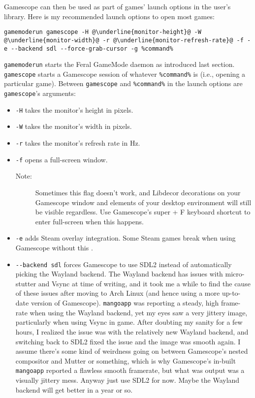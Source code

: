 \documentclass[a4paper]{article}
\begin{document}
Gamescope can then be used as part of games' launch options in the user's library.
Here is my recommended launch options to open most games:
\begin{lstlisting}[escapechar=@]
gamemoderun gamescope -H @\underline{monitor-height}@ -W @\underline{monitor-width}@ -r @\underline{monitor-refresh-rate}@ -f -e --backend sdl --force-grab-cursor -g %command%
\end{lstlisting}
\lstinline|gamemoderun| starts the Feral GameMode daemon as introduced last section.
\lstinline|gamescope| starts a Gamescope session of whatever \lstinline|%command%| is (i.e., opening a particular game).
Between \lstinline|gamescope| and \lstinline|%command%| in the launch options are \lstinline|gamescope|'s arguments:
\begin{itemize}
    \item \lstinline|-H| takes the monitor's height in pixels.
    \item \lstinline|-W| takes the monitor's width in pixels.
    \item \lstinline|-r| takes the monitor's refresh rate in Hz.
    \item \lstinline|-f| opens a full-screen window.
    \begin{description}
        \item[Note:] Sometimes this flag doesn't work, and Libdecor decorations on your Gamescope window and elements of your desktop environment will still be visible regardless. Use Gamescope's super + F keyboard shortcut to enter full-screen when this happens.
    \end{description}
    \item \lstinline|-e| adds Steam overlay integration. Some Steam games break when using Gamescope without this \cite{arch-wiki-gamescope}.
    \item \lstinline|--backend sdl| forces Gamescope to use SDL2 instead of automatically picking the Wayland backend. The Wayland backend has issues with micro-stutter and Vsync at time of writing, and it took me a while to find the cause of these issues after moving to Arch Linux (and hence using a more up-to-date version of Gamescope). \lstinline|mangoapp| was reporting a steady, high frame-rate when using the Wayland backend, yet my eyes saw a very jittery image, particularly when using Vsync in game. After doubting my sanity for a few hours, I realized the issue was with the relatively new Wayland backend, and switching back to SDL2 fixed the issue and the image was smooth again. I assume there's some kind of weirdness going on between Gamescope's nested compositor and Mutter or something, which is why Gamescope's in-built \lstinline|mangoapp| reported a flawless smooth framerate, but what was output was a visually jittery mess. Anyway just use SDL2 for now. Maybe the Wayland backend will get better in a year or so.

\end{itemize}
\end{document}
